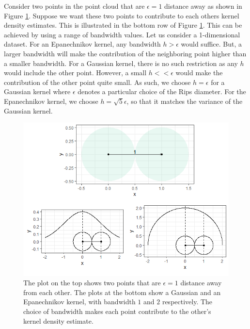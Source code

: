 \documentclass[11pt,a4paper,]{article}
\theoremstyle{definition}
\theoremstyle{definition}
\theoremstyle{definition}
\theoremstyle{remark}
\begin{document}
Consider two points in the point cloud that are \(\epsilon = 1\) distance away as shown in Figure \ref{fig:epsilonandkernels}. Suppose we want these two points to contribute to each others kernel density estimates. This is illustrated in the bottom row of Figure \ref{fig:epsilonandkernels}. This can be achieved by using a range of bandwidth values. Let us consider a 1-dimensional dataset. For an Epanechnikov kernel, any bandwidth \(h>\epsilon\) would suffice. But, a larger bandwidth will make the contribution of the neighboring point higher than a smaller bandwidth. For a Gaussian kernel, there is no such restriction as any \(h\) would include the other point. However, a small \(h < < \epsilon\) would make the contribution of the other point quite small. As such, we choose \(h=\epsilon\) for a Gaussian kernel where \(\epsilon\) denotes a particular choice of the Rips diameter. For the Epanechnikov kernel, we choose \(h = \sqrt{5} \epsilon\), so that it matches the variance of the Gaussian kernel.

\begin{figure}[!ht]
    \centering
    \includegraphics[scale=0.8]{../Graphics/circles_and_kernels.png}
    \caption{The plot on the top shows two points that are  $\epsilon = 1$ distance away from each other. The plots at the bottom show a Gaussian and an Epanechnikov kernel, with bandwidth $1$ and $2$ respectively. The choice of bandwidth makes each point contribute to the other's kernel density estimate. }
    \label{fig:epsilonandkernels}
\end{figure}
\end{document}
